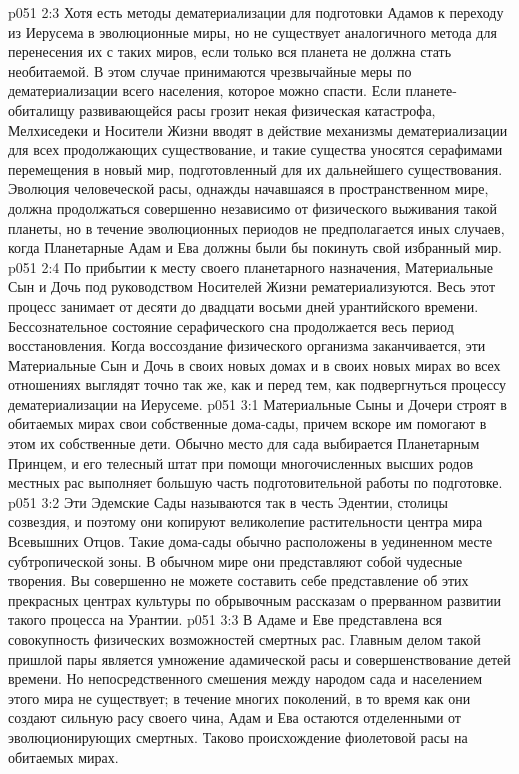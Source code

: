 \vs p051 2:3 \pc Хотя есть методы дематериализации для подготовки Адамов к переходу из Иерусема в эволюционные миры, но не существует аналогичного метода для перенесения их с таких миров, если только вся планета не должна стать необитаемой. В этом случае принимаются чрезвычайные меры по дематериализации всего населения, которое можно спасти. Если планете\hyp{}обиталищу развивающейся расы грозит некая физическая катастрофа, Мелхиседеки и Носители Жизни вводят в действие механизмы дематериализации для всех продолжающих существование, и такие существа уносятся серафимами перемещения в новый мир, подготовленный для их дальнейшего существования. Эволюция человеческой расы, однажды начавшаяся в пространственном мире, должна продолжаться совершенно независимо от физического выживания такой планеты, но в течение эволюционных периодов не предполагается иных случаев, когда Планетарные Адам и Ева должны были бы покинуть свой избранный мир.
\vs p051 2:4 \pc По прибытии к месту своего планетарного назначения, Материальные Сын и Дочь под руководством Носителей Жизни рематериализуются. Весь этот процесс занимает от десяти до двадцати восьми дней урантийского времени. Бессознательное состояние серафического сна продолжается весь период восстановления. Когда воссоздание физического организма заканчивается, эти Материальные Сын и Дочь в своих новых домах и в своих новых мирах во всех отношениях выглядят точно так же, как и перед тем, как подвергнуться процессу дематериализации на Иерусеме.
\vs p051 3:1 Материальные Сыны и Дочери строят в обитаемых мирах свои собственные дома\hyp{}сады, причем вскоре им помогают в этом их собственные дети. Обычно место для сада выбирается Планетарным Принцем, и его телесный штат при помощи многочисленных высших родов местных рас выполняет большую часть подготовительной работы по подготовке.
\vs p051 3:2 Эти Эдемские Сады называются так в честь Эдентии, столицы созвездия, и поэтому они копируют великолепие растительности центра мира Всевышних Отцов. Такие дома\hyp{}сады обычно расположены в уединенном месте субтропической зоны. В обычном мире они представляют собой чудесные творения. Вы совершенно не можете составить себе представление об этих прекрасных центрах культуры по обрывочным рассказам о прерванном развитии такого процесса на Урантии.
\vs p051 3:3 \pc В Адаме и Еве представлена вся совокупность физических возможностей смертных рас. Главным делом такой пришлой пары является умножение адамической расы и совершенствование детей времени. Но непосредственного смешения между народом сада и населением этого мира не существует; в течение многих поколений, в то время как они создают сильную расу своего чина, Адам и Ева остаются отделенными от эволюционирующих смертных. Таково происхождение фиолетовой расы на обитаемых мирах.
